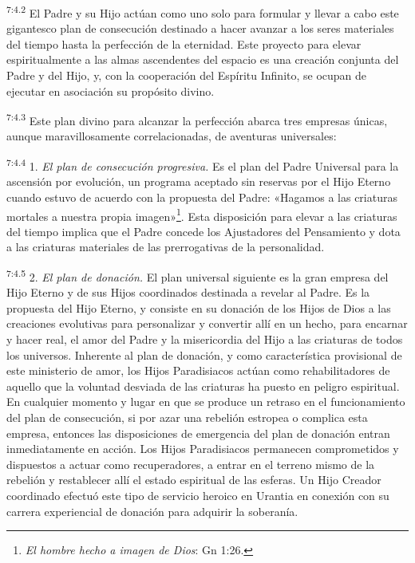 \par
\textsuperscript{7:4.2} El Padre y su Hijo actúan como uno solo para formular y llevar a cabo este gigantesco plan de consecución destinado a hacer avanzar a los seres materiales del tiempo hasta la perfección de la eternidad. Este proyecto para elevar espiritualmente a las almas ascendentes del espacio es una creación conjunta del Padre y del Hijo, y, con la cooperación del Espíritu Infinito, se ocupan de ejecutar en asociación su propósito divino.

\par
\textsuperscript{7:4.3} Este plan divino para alcanzar la perfección abarca tres empresas únicas, aunque maravillosamente correlacionadas, de aventuras universales:

\par
\textsuperscript{7:4.4} 1. \textit{El plan de consecución progresiva.} Es el plan del Padre Universal para la ascensión por evolución, un programa aceptado sin reservas por el Hijo Eterno cuando estuvo de acuerdo con la propuesta del Padre: «Hagamos a las criaturas mortales a nuestra propia imagen»\footnote{\textit{El hombre hecho a imagen de Dios}: Gn 1:26.}. Esta disposición para elevar a las criaturas del tiempo implica que el Padre concede los Ajustadores del Pensamiento y dota a las criaturas materiales de las prerrogativas de la personalidad.

\par
\textsuperscript{7:4.5} 2. \textit{El plan de donación.} El plan universal siguiente es la gran empresa del Hijo Eterno y de sus Hijos coordinados destinada a revelar al Padre. Es la propuesta del Hijo Eterno, y consiste en su donación de los Hijos de Dios a las creaciones evolutivas para personalizar y convertir allí en un hecho, para encarnar y hacer real, el amor del Padre y la misericordia del Hijo a las criaturas de todos los universos. Inherente al plan de donación, y como característica provisional de este ministerio de amor, los Hijos Paradisiacos actúan como rehabilitadores de aquello que la voluntad desviada de las criaturas ha puesto en peligro espiritual. En cualquier momento y lugar en que se produce un retraso en el funcionamiento del plan de consecución, si por azar una rebelión estropea o complica esta empresa, entonces las disposiciones de emergencia del plan de donación entran inmediatamente en acción. Los Hijos Paradisiacos permanecen comprometidos y dispuestos a actuar como recuperadores, a entrar en el terreno mismo de la rebelión y restablecer allí el estado espiritual de las esferas. Un Hijo Creador coordinado efectuó este tipo de servicio heroico en Urantia en conexión con su carrera experiencial de donación para adquirir la soberanía.

